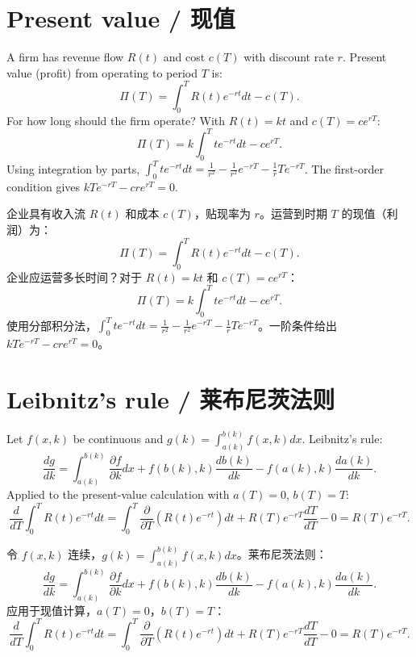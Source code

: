 \section{Present value / 现值}

\begin{original}
A firm has revenue flow $R(t)$ and cost $c(T)$ with discount rate $r$. Present value (profit) from operating to period $T$ is:
\[
\Pi(T) = \int_0^T R(t)e^{-rt}dt - c(T).
\]
For how long should the firm operate? With $R(t) = kt$ and $c(T) = ce^{rT}$:
\[
\Pi(T) = k\int_0^T te^{-rt}dt - ce^{rT}.
\]
Using integration by parts, $\int_0^T te^{-rt}dt = \frac{1}{r^2} - \frac{1}{r^2}e^{-rT} - \frac{1}{r}Te^{-rT}$. The first-order condition gives $kTe^{-rT} - cre^{rT} = 0$.
\end{original}
\begin{translation}
企业具有收入流 $R(t)$ 和成本 $c(T)$，贴现率为 $r$。运营到时期 $T$ 的现值（利润）为：
\[
\Pi(T) = \int_0^T R(t)e^{-rt}dt - c(T).
\]
企业应运营多长时间？对于 $R(t) = kt$ 和 $c(T) = ce^{rT}$：
\[
\Pi(T) = k\int_0^T te^{-rt}dt - ce^{rT}.
\]
使用分部积分法，$\int_0^T te^{-rt}dt = \frac{1}{r^2} - \frac{1}{r^2}e^{-rT} - \frac{1}{r}Te^{-rT}$。一阶条件给出 $kTe^{-rT} - cre^{rT} = 0$。
\end{translation}

\section{Leibnitz's rule / 莱布尼茨法则}

\begin{original}
Let $f(x, k)$ be continuous and $g(k) = \int_{a(k)}^{b(k)} f(x, k)dx$. Leibnitz's rule:
\[
\frac{dg}{dk} = \int_{a(k)}^{b(k)} \frac{\partial f}{\partial k} dx + f(b(k), k)\frac{db(k)}{dk} - f(a(k), k)\frac{da(k)}{dk}.
\]
Applied to the present-value calculation with $a(T) = 0$, $b(T) = T$:
\[
\frac{d}{dT}\int_0^T R(t)e^{-rt}dt = \int_0^T \frac{\partial}{\partial T}(R(t)e^{-rt})dt + R(T)e^{-rT}\frac{dT}{dT} - 0 = R(T)e^{-rT}.
\]
\end{original}
\begin{translation}
令 $f(x, k)$ 连续，$g(k) = \int_{a(k)}^{b(k)} f(x, k)dx$。莱布尼茨法则：
\[
\frac{dg}{dk} = \int_{a(k)}^{b(k)} \frac{\partial f}{\partial k} dx + f(b(k), k)\frac{db(k)}{dk} - f(a(k), k)\frac{da(k)}{dk}.
\]
应用于现值计算，$a(T) = 0$，$b(T) = T$：
\[
\frac{d}{dT}\int_0^T R(t)e^{-rt}dt = \int_0^T \frac{\partial}{\partial T}(R(t)e^{-rt})dt + R(T)e^{-rT}\frac{dT}{dT} - 0 = R(T)e^{-rT}.
\]
\end{translation}

